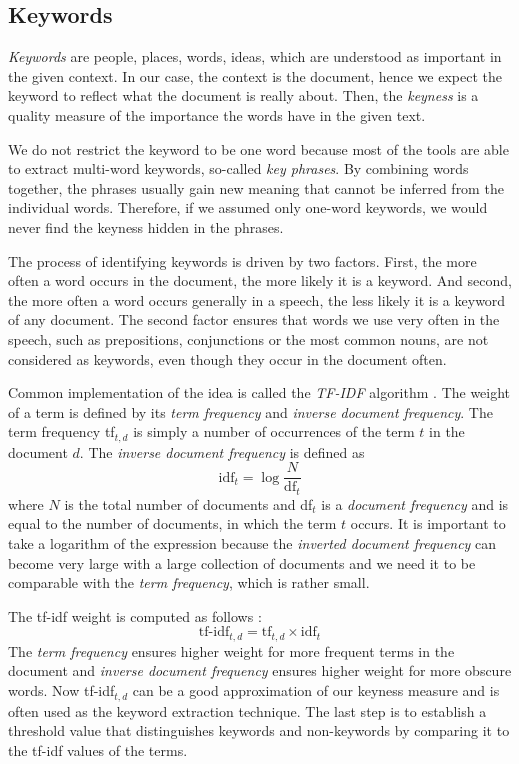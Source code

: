 \documentclass[
  digital, %
  table,   %
  lof,     %
  lot,     %
]{fithesis3}
\begin{document}
\subsection{Keywords}
\label{algorithms_keywords}
\emph{Keywords} are people, places, words, ideas, which are understood as important in the given context. 
In our case, the context is the document, hence we expect the keyword to reflect what the document is really about.
Then, the \textit{keyness} is a quality measure of the importance the words have in the given text.
\cite[ch. 4]{scott2006textual}

We do not restrict the keyword to be one word because most of the tools are able to extract multi-word keywords, so-called \textit{key phrases}.
By combining words together, the phrases usually gain new meaning that cannot be inferred from the individual words.
Therefore, if we assumed only one-word keywords, we would never find the keyness hidden in the phrases.

The process of identifying keywords is driven by two factors.
First, the more often a word occurs in the document, the more likely it is a keyword.
And second, the more often a word occurs generally in a speech, the less likely it is a keyword of any document.
\cite[ch. 4]{scott2006textual}
The second factor ensures that words we use very often in the speech, such as prepositions, conjunctions or the most common nouns, are not considered as keywords, even though they occur in the document often.

Common implementation of the idea is called the \textit{TF-IDF} algorithm \cite[ch. 6]{manning2008introduction}.
The weight of a term is defined by its \textit{term frequency} and \textit{inverse document frequency}.
The term frequency tf$_{t,d}$ is simply a number of occurrences of the term $t$ in the document $d$. The \textit{inverse document frequency} is defined as
$$
\text{idf}_t = \log{\frac{N}{\text{df}_t}}
$$
where $N$ is the total number of documents and df$_{t}$ is a \textit{document frequency} and is equal to the number of documents, in which the term $t$ occurs.
It is important to take a logarithm of the expression because the \textit{inverted document frequency} can become very large with a large collection of documents and we need it to be comparable with the \textit{term frequency}, which is rather small.

The tf-idf weight is computed as follows \cite[ch. 6]{manning2008introduction}:
$$
\text{tf-idf}_{t, d} = \text{tf}_{t,d} \times \text{idf}_t
$$
The \textit{term frequency} ensures higher weight for more frequent terms in the document and \textit{inverse document frequency} ensures higher weight for more obscure words. Now tf-idf$_{t, d}$ can be a good approximation of our keyness measure and is often used as the keyword extraction technique. The last step is to establish a threshold value that distinguishes keywords and non-keywords by comparing it to the tf-idf values of the terms.
\end{document}
